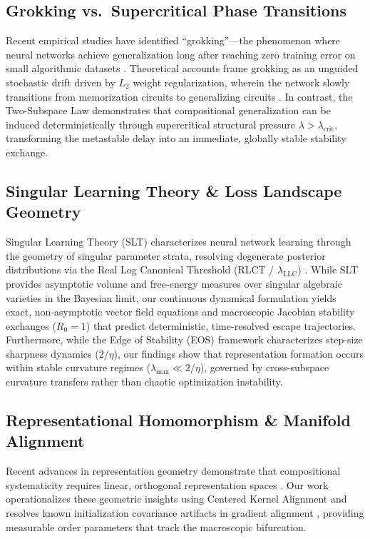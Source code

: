 \documentclass{article}
\theoremstyle{plain}
\theoremstyle{definition}
\begin{document}
\subsection{Grokking vs.\ Supercritical Phase Transitions}
Recent empirical studies have identified ``grokking''—the phenomenon where neural networks achieve generalization long after reaching zero training error on small algorithmic datasets \citep{Power2022Grokking,Liu2022Grokking,Nakkiran2021Deep}. Theoretical accounts frame grokking as an unguided stochastic drift driven by $L_2$ weight regularization, wherein the network slowly transitions from memorization circuits to generalizing circuits \citep{Varma2023Explaining,Merrill2023Tale}. In contrast, the Two-Subspace Law demonstrates that compositional generalization can be induced deterministically through supercritical structural pressure $\lambda > \lambda_{\text{crit}}$, transforming the metastable delay into an immediate, globally stable stability exchange.

\subsection{Singular Learning Theory \& Loss Landscape Geometry}
Singular Learning Theory (SLT) characterizes neural network learning through the geometry of singular parameter strata, resolving degenerate posterior distributions via the Real Log Canonical Threshold (RLCT / $\lambda_{\text{LLC}}$) \citep{Watanabe2009Algebraic,Lau2023Quantifying}. While SLT provides asymptotic volume and free-energy measures over singular algebraic varieties in the Bayesian limit, our continuous dynamical formulation yields exact, non-asymptotic vector field equations and macroscopic Jacobian stability exchanges ($R_0 = 1$) that predict deterministic, time-resolved escape trajectories. Furthermore, while the Edge of Stability (EOS) framework \citep{Cohen2021Gradient,Ghorbani2019Investigation,Yao2020PyHessian} characterizes step-size sharpness dynamics ($2/\eta$), our findings show that representation formation occurs within stable curvature regimes ($\lambda_{\text{max}} \ll 2/\eta$), governed by cross-subspace curvature transfers rather than chaotic optimization instability.
\subsection{Representational Homomorphism \& Manifold Alignment}
Recent advances in representation geometry demonstrate that compositional systematicity requires linear, orthogonal representation spaces \citep{Uselis2026Compositional,An2026Representational,Lippl2024Kernel}. Our work operationalizes these geometric insights using Centered Kernel Alignment \citep{Kornblith2019Similarity,Raghu2021Vision,Davari2022Reliability} and resolves known initialization covariance artifacts in gradient alignment \citep{Raju2026Geometric,Sevetlidis2026Gauge}, providing measurable order parameters that track the macroscopic bifurcation.
\end{document}
